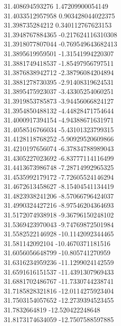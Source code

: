 {31.408694593276	1.47209900054149\\
31.4033512957958	0.903428044022375\\
31.398735284212	0.340112767623153\\
31.3948767884365	-0.217624116310308\\
31.3918077807044	-0.769549643682413\\
31.3895619959501	-1.31541994220307\\
31.3881749418537	-1.85497956797511\\
31.3876838942712	-2.38796084204894\\
31.3881278730395	-2.91408319624531\\
31.3895475923037	-3.43305254060251\\
31.3919853785873	-3.94456066824127\\
31.3954850488132	-4.44828471754644\\
31.4000917394154	-4.94388671631971\\
31.4058516766034	-5.43101323799315\\
31.4128118768252	-5.90929520609866\\
31.4210197656074	-6.37834788989043\\
31.4305227023692	-6.83777114116499\\
31.4413673986748	-7.28714992965325\\
31.4535992179172	-7.72605524146294\\
31.4672613458627	-8.15404541134419\\
31.4823938241206	-8.57066796424037\\
31.4990324427216	-8.97546204364693\\
31.5172074938918	-9.36796150248102\\
31.5369423970043	-9.74769872501984\\
31.5582522146928	-10.1142092344465\\
31.581142092104	-10.4670371181516\\
31.6056056648799	-10.805741270959\\
31.6316234959236	-11.1299024142559\\
31.6591616151537	-11.4391307969433\\
31.6881702486767	-11.7330744238741\\
31.7185828321816	-12.0114275923404\\
31.7503154057652	-12.2739394523455\\
31.7832664819	-12.520422248648\\
31.8173174634059	-12.7507588597885\\
}
